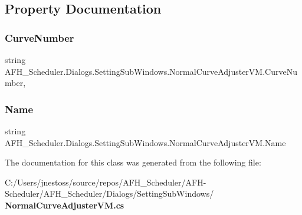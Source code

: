 \subsection{Property Documentation}
\mbox{\label{class_a_f_h___scheduler_1_1_dialogs_1_1_setting_sub_windows_1_1_normal_curve_adjuster_v_m_ac4c445be5c61cc15adc80bf983a6da9f}} 
\subsubsection{CurveNumber}
{\footnotesize\ttfamily string A\+F\+H\+\_\+\+Scheduler.\+Dialogs.\+Setting\+Sub\+Windows.\+Normal\+Curve\+Adjuster\+V\+M.\+Curve\+Number\hspace{0.3cm}{\ttfamily [get]}, {\ttfamily [set]}}

\mbox{\label{class_a_f_h___scheduler_1_1_dialogs_1_1_setting_sub_windows_1_1_normal_curve_adjuster_v_m_a9f31d42943c587926cce63c2d9d848b3}} 
\subsubsection{Name}
{\footnotesize\ttfamily string A\+F\+H\+\_\+\+Scheduler.\+Dialogs.\+Setting\+Sub\+Windows.\+Normal\+Curve\+Adjuster\+V\+M.\+Name\hspace{0.3cm}{\ttfamily [get]}}



The documentation for this class was generated from the following file\+:\begin{DoxyCompactItemize}
\item 
C\+:/\+Users/jnestoss/source/repos/\+A\+F\+H\+\_\+\+Scheduler/\+A\+F\+H-\/\+Scheduler/\+A\+F\+H\+\_\+\+Scheduler/\+Dialogs/\+Setting\+Sub\+Windows/\textbf{ Normal\+Curve\+Adjuster\+V\+M.\+cs}\end{DoxyCompactItemize}
